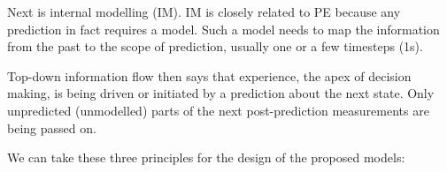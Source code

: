 \documentclass[11pt]{llncs}
\begin{document}

Next is internal modelling (IM). IM is closely related to PE because
any prediction in fact requires a model. Such a model needs to map the
information from the past to the scope of prediction, usually one or a
few timesteps (1s).

Top-down information flow then says that experience, the apex of
decision making, is being driven or initiated by a prediction about
the next state. Only unpredicted (unmodelled) parts of the next
post-prediction measurements are being passed on.


We can take these three principles for the design of the proposed models:
\end{document}
